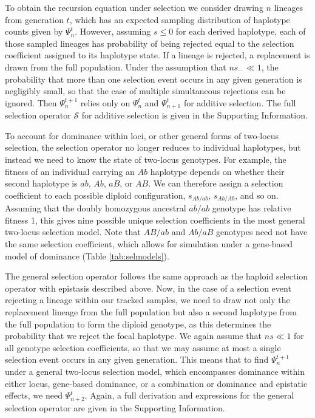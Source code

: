 \documentclass[]{article}
\begin{document}
To obtain the recursion equation under selection we consider drawing \(n\)
lineages from generation \(t\), which has an expected sampling distribution of
haplotype counts given by \(\Psi_n^t\). However, assuming \(s\leq0\) for each
derived haplotype, each of those sampled lineages has probability of being
rejected equal to the selection coefficient assigned to its haplotype state. If
a lineage is rejected, a replacement is drawn from the full population. Under
the assumption that \(ns_{\cdot\cdot} \ll 1\), the probability that more than one
selection event occurs in any given generation is negligibly small, so that the
case of multiple simultaneous rejections can be ignored. Then \(\Psi_n^{t+1}\)
relies only on \(\Psi_n^t\) and \(\Psi_{n+1}^t\) for additive selection. The full
selection operator \(\mathcal{S}\) for additive selection is given in the
Supporting Information.

To account for dominance within loci, or other general forms of two-locus
selection, the selection operator no longer reduces to individual haplotypes,
but instead we need to know the state of two-locus genotypes. For example, the
fitness of an individual carrying an \(Ab\) haplotype depends on whether their
second haplotype is \(ab\), \(Ab\), \(aB\), or \(AB\). We can therefore assign a
selection coefficient to each possible diploid configuration, \(s_{Ab/ab}\),
\(s_{Ab/Ab}\), and so on. Assuming that the doubly homozygous ancestral \(ab/ab\)
genotype has relative fitness 1, this gives nine possible unique selection
coefficients in the most general two-locus selection model. Note that \(AB/ab\)
and \(Ab/aB\) genotypes need not have the same selection coefficient, which
allows for simulation under a gene-based model of dominance (Table
\ref{tab:selmodels}).

The general selection operator follows the same approach as the haploid
selection operator with epistasis described above. Now, in the case of a
selection event rejecting a lineage within our tracked samples, we need to draw
not only the replacement lineage from the full population but also a second
haplotype from the full population to form the diploid genotype, as this
determines the probability that we reject the focal haplotype. We again assume
that \(ns \ll 1\) for all genotype selection coefficients, so that we may assume
at most a single selection event occurs in any given generation. This means
that to find \(\Psi_n^{t+1}\) under a general two-locus selection model, which
encompasses dominance within either locus, gene-based dominance, or a
combination or dominance and epistatic effects, we need \(\Psi_{n+2}^t\). Again,
a full derivation and expressions for the general selection operator are given
in the Supporting Information.
\end{document}
